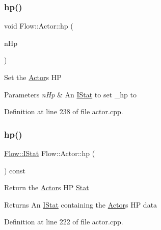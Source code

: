 \subsubsection{\texorpdfstring{hp()}{hp()}\hspace{0.1cm}{\footnotesize\ttfamily [2/3]}}
{\footnotesize\ttfamily void Flow\+::\+Actor\+::hp (\begin{DoxyParamCaption}\item[{const \hyperlink{class_flow_1_1_i_stat}{I\+Stat} \&}]{n\+Hp }\end{DoxyParamCaption})}

Set the \hyperlink{class_flow_1_1_actor}{Actor}\textquotesingle{}s HP 
\begin{DoxyParams}{Parameters}
{\em n\+Hp} & An \hyperlink{class_flow_1_1_i_stat}{I\+Stat} to set \+\_\+hp to \\
\hline
\end{DoxyParams}


Definition at line 238 of file actor.\+cpp.

\hypertarget{class_flow_1_1_actor_aaea76048a01d31bfc82a0eeb53c5cbdb}{}\label{class_flow_1_1_actor_aaea76048a01d31bfc82a0eeb53c5cbdb} 
\subsubsection{\texorpdfstring{hp()}{hp()}\hspace{0.1cm}{\footnotesize\ttfamily [3/3]}}
{\footnotesize\ttfamily \hyperlink{class_flow_1_1_i_stat}{Flow\+::\+I\+Stat} Flow\+::\+Actor\+::hp (\begin{DoxyParamCaption}{ }\end{DoxyParamCaption}) const}

Return the \hyperlink{class_flow_1_1_actor}{Actor}\textquotesingle{}s HP \hyperlink{class_flow_1_1_stat}{Stat} \begin{DoxyReturn}{Returns}
An \hyperlink{class_flow_1_1_i_stat}{I\+Stat} containing the \hyperlink{class_flow_1_1_actor}{Actor}\textquotesingle{}s HP data 
\end{DoxyReturn}


Definition at line 222 of file actor.\+cpp.

\hypertarget{class_flow_1_1_actor_ae4cb3aadfe983b6bee09b27649dbb704}{}\label{class_flow_1_1_actor_ae4cb3aadfe983b6bee09b27649dbb704} 
